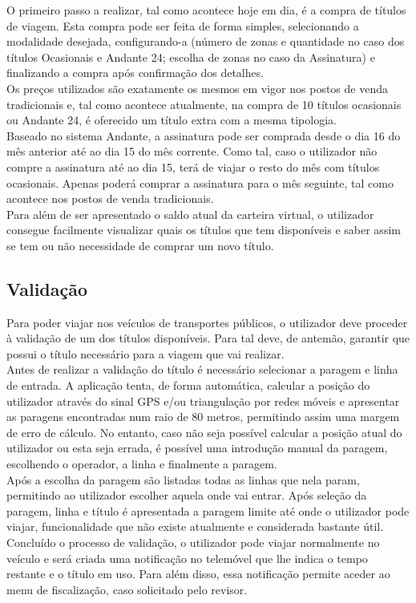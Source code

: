 O primeiro passo a realizar, tal como acontece hoje em dia, é a compra de títulos de viagem. Esta compra pode ser feita de forma simples, selecionando a modalidade desejada, configurando-a (número de zonas e quantidade no caso dos títulos Ocasionais e Andante 24; escolha de zonas no caso da Assinatura) e finalizando a compra após confirmação dos detalhes.
\\Os preços utilizados são exatamente os mesmos em vigor nos postos de venda tradicionais e, tal como acontece atualmente, na compra de 10 títulos ocasionais ou Andante 24, é oferecido um título extra com a mesma tipologia.
\\Baseado no sistema Andante, a assinatura pode ser comprada desde o dia 16 do mês anterior até ao dia 15 do mês corrente. Como tal, caso o utilizador não compre a assinatura até ao dia 15, terá de viajar o resto do mês com títulos ocasionais. Apenas poderá comprar a assinatura para o mês seguinte, tal como acontece nos postos de venda tradicionais.
\\Para além de ser apresentado o saldo atual da carteira virtual, o utilizador consegue facilmente visualizar quais os títulos que tem disponíveis e saber assim se tem ou não necessidade de comprar um novo título.

\subsection{Validação}

Para poder viajar nos veículos de transportes públicos, o utilizador deve proceder à validação de um dos títulos disponíveis. Para tal deve, de antemão, garantir que possui o título necessário para a viagem que vai realizar.
\\Antes de realizar a validação do título é necessário selecionar a paragem e linha de entrada. A aplicação tenta, de forma automática, calcular a posição do utilizador através do sinal GPS e/ou triangulação por redes móveis e apresentar as paragens encontradas num raio de 80 metros, permitindo assim uma margem de erro de cálculo. No entanto, caso não seja possível calcular a posição atual do utilizador ou esta seja errada, é possível uma introdução manual da paragem, escolhendo o operador, a linha e finalmente a paragem.
\\Após a escolha da paragem são listadas todas as linhas que nela param, permitindo ao utilizador escolher aquela onde vai entrar. Após seleção da paragem, linha e título é apresentada a paragem limite até onde o utilizador pode viajar, funcionalidade que não existe atualmente e considerada bastante útil.
\\Concluído o processo de validação, o utilizador pode viajar normalmente no veículo e será criada uma notificação no telemóvel que lhe indica o tempo restante e o título em uso. Para além disso, essa notificação permite aceder ao menu de fiscalização, caso solicitado pelo revisor.

